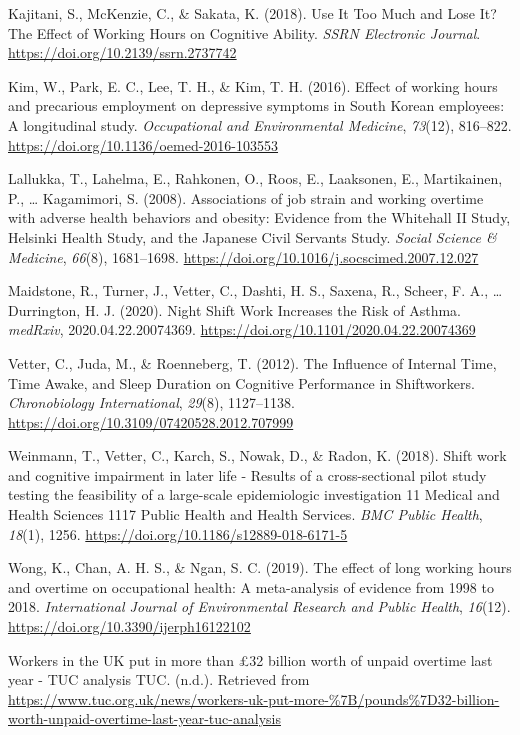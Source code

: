 \documentclass[
  english,
  man]{apa6}
\newlength{\cslhangindent}
\newenvironment{cslreferences}%
  {\setlength{\parindent}{0pt}%
  \everypar{\setlength{\hangindent}{\cslhangindent}}\ignorespaces}%
  {\par}
\begin{document}
\begin{cslreferences}
\leavevmode\hypertarget{ref-Kajitani2018}{}%
Kajitani, S., McKenzie, C., \& Sakata, K. (2018). Use It Too Much and Lose It? The Effect of Working Hours on Cognitive Ability. \emph{SSRN Electronic Journal}. \url{https://doi.org/10.2139/ssrn.2737742}

\leavevmode\hypertarget{ref-Kim2016}{}%
Kim, W., Park, E. C., Lee, T. H., \& Kim, T. H. (2016). Effect of working hours and precarious employment on depressive symptoms in South Korean employees: A longitudinal study. \emph{Occupational and Environmental Medicine}, \emph{73}(12), 816--822. \url{https://doi.org/10.1136/oemed-2016-103553}

\leavevmode\hypertarget{ref-Lallukka2008}{}%
Lallukka, T., Lahelma, E., Rahkonen, O., Roos, E., Laaksonen, E., Martikainen, P., \ldots{} Kagamimori, S. (2008). Associations of job strain and working overtime with adverse health behaviors and obesity: Evidence from the Whitehall II Study, Helsinki Health Study, and the Japanese Civil Servants Study. \emph{Social Science \& Medicine}, \emph{66}(8), 1681--1698. \url{https://doi.org/10.1016/j.socscimed.2007.12.027}

\leavevmode\hypertarget{ref-Maidstone2020}{}%
Maidstone, R., Turner, J., Vetter, C., Dashti, H. S., Saxena, R., Scheer, F. A., \ldots{} Durrington, H. J. (2020). Night Shift Work Increases the Risk of Asthma. \emph{medRxiv}, 2020.04.22.20074369. \url{https://doi.org/10.1101/2020.04.22.20074369}

\leavevmode\hypertarget{ref-Vetter2012}{}%
Vetter, C., Juda, M., \& Roenneberg, T. (2012). The Influence of Internal Time, Time Awake, and Sleep Duration on Cognitive Performance in Shiftworkers. \emph{Chronobiology International}, \emph{29}(8), 1127--1138. \url{https://doi.org/10.3109/07420528.2012.707999}

\leavevmode\hypertarget{ref-Weinmann2018}{}%
Weinmann, T., Vetter, C., Karch, S., Nowak, D., \& Radon, K. (2018). Shift work and cognitive impairment in later life - Results of a cross-sectional pilot study testing the feasibility of a large-scale epidemiologic investigation 11 Medical and Health Sciences 1117 Public Health and Health Services. \emph{BMC Public Health}, \emph{18}(1), 1256. \url{https://doi.org/10.1186/s12889-018-6171-5}

\leavevmode\hypertarget{ref-Wong2019}{}%
Wong, K., Chan, A. H. S., \& Ngan, S. C. (2019). The effect of long working hours and overtime on occupational health: A meta-analysis of evidence from 1998 to 2018. \emph{International Journal of Environmental Research and Public Health}, \emph{16}(12). \url{https://doi.org/10.3390/ijerph16122102}

\leavevmode\hypertarget{ref-TUC3}{}%
Workers in the UK put in more than £32 billion worth of unpaid overtime last year - TUC analysis \textbar{} TUC. (n.d.). Retrieved from \url{https://www.tuc.org.uk/news/workers-uk-put-more-\%7B/pounds\%7D32-billion-worth-unpaid-overtime-last-year-tuc-analysis}
\end{cslreferences}

\endgroup
\end{document}
